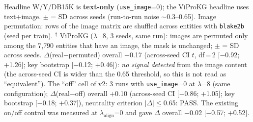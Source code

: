 \begin{table}[t]
\vspace{2pt}
\begin{minipage}{\linewidth}\footnotesize\raggedright
Headline W/Y/DB15K is \textbf{text-only} (\texttt{use\_image}=0); the ViProKG headline uses
text+image. $\pm$ = SD across seeds (run-to-run noise $\sim$0.3--0.65). Image permutation: rows
of the image matrix are shuffled across entities with \texttt{blake2b} (seed per train).
$^{\dagger}$ ViProKG ($\lambda$=8, 3 seeds, same run): images are permuted only among the 7{,}790 entities that have an image, the mask is unchanged; $\pm$ = SD across seeds. $\Delta$(real$-$permuted) overall +0.17 (across-seed CI $t$, df\,=\,2 [$-$0.92; +1.26]; key bootstrap [$-$0.12; +0.46]): \emph{no signal detected} from the image content (the across-seed CI is wider than the 0.65 threshold, so this is not read as ``equivalent''). The ``off'' cell of v2: 3 runs with \texttt{use\_image}=0 at $\lambda$=8 (same configuration); $\Delta$(real$-$off) overall +0.10 (across-seed CI [$-$0.86; +1.05]; key bootstrap [$-$0.18; +0.37]), neutrality criterion $|\Delta|\le$0.65: PASS. The existing on/off control was measured at $\lambda_{\text{align}}$=0 and gave $\Delta$ overall $-$0.02 [$-$0.57; +0.52].
\end{minipage}
\end{table}
